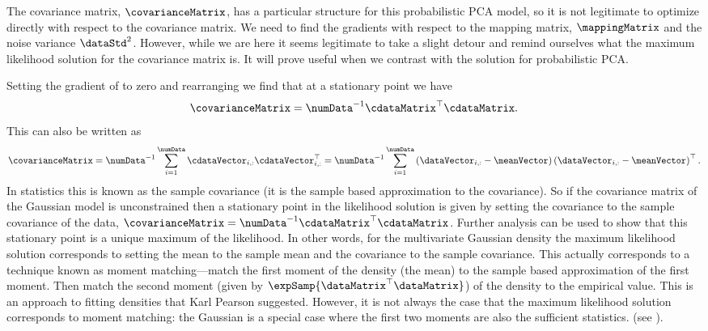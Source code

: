 The covariance matrix, $\covarianceMatrix$, has a particular structure
for this probabilistic PCA model, so it is not legitimate to optimize
directly with respect to the covariance matrix. We need to find the
gradients with respect to the mapping matrix, $\mappingMatrix$ and the
noise variance $\dataStd^2$. However, while we are here it seems
legitimate to take a slight detour and remind ourselves what the
maximum likelihood solution for the covariance matrix is. It will
prove useful when we contrast with the solution for probabilistic PCA.

Setting the gradient of  to zero and
rearranging we find that at a stationary point we have
\[
\covarianceMatrix = \numData^{-1}\cdataMatrix^\top\cdataMatrix.
\]
This can also be written as
\[
\covarianceMatrix = \numData^{-1} \sum_{i=1}^\numData \cdataVector_{i,
  :}\cdataVector_{i, :}^\top = \numData^{-1}\sum_{i=1}^\numData
\left(\dataVector_{i, :}-\meanVector\right)\left(\dataVector_{i,
    :}-\meanVector\right)^\top.
\]
In statistics this is known as the sample covariance (it is the sample
based approximation to the covariance). So if the covariance matrix of
the Gaussian model is unconstrained then a stationary point in the
likelihood solution is given by setting the covariance to the sample
covariance of the data, $\covarianceMatrix =
\numData^{-1}\cdataMatrix^\top\cdataMatrix$. Further analysis can be
used to show that this stationary point is a unique maximum of the
likelihood. In other words, for the multivariate
Gaussian density the maximum likelihood solution corresponds to
setting the mean to the sample mean and the covariance to the sample
covariance. This actually corresponds to a technique known as moment
matching---match the first moment of the
density (the mean) to the sample based approximation of the first
moment. Then match the second moment (given by
$\expSamp{\dataMatrix^\top\dataMatrix}$) of the density to the
empirical value. This is an approach to fitting densities that Karl
Pearson suggested. However, it is not always the
case that the maximum likelihood solution corresponds to moment
matching: the Gaussian is a special case where the first two moments
are also the sufficient statistics. (see
).

